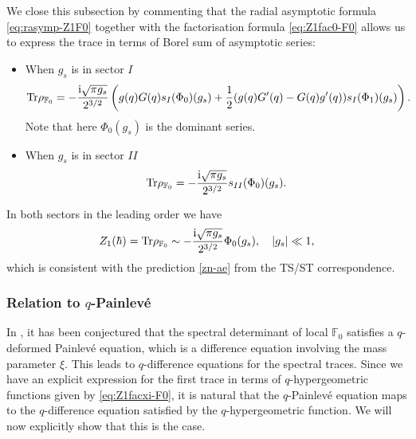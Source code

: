 \documentclass[a4paper,11pt]{article}
\theoremstyle{definition}
\def\IF{{\mathbb F}}
\newcommand{\tr}{{\rm Tr}}
\newcommand{\ri}{{\rm i}}
\begin{document}
 We close this subsection by commenting that the radial
asymptotic formula \eqref{eq:rasymp-Z1F0} together with the
factorisation formula \eqref{eq:Z1fac0-F0} allows us to express the
trace in terms of Borel sum of asymptotic series:
\begin{itemize}
\item When $g_s$ is in sector $I$
  \begin{equation}
    \tr\rho_{\IF_0} = -\frac{\ri\sqrt{\pi g_s}}{2^{3/2}}
    \left(g(q)G(q)s_I(\Phi_{0})(g_s)
      +\frac{1}{2}(g(q)G'(q)-G(q)g'(q))s_I(\Phi_{1})(g_s)\right).
  \end{equation}
  Note that here $\Phi_0(g_s)$ is the dominant series.
\item When $g_s$ is in sector $II$
  \begin{equation}
    \tr\rho_{\IF_0} = -\frac{\ri\sqrt{\pi g_s}}{2^{3/2}} s_{II}(\Phi_{0})(g_s).
  \end{equation}
\end{itemize}
In both sectors in the leading order we have
\begin{equation}
  Z_1(\hbar) = \tr\rho_{\IF_0}\sim
  -\frac{\ri\sqrt{\pi g_s}}{2^{3/2}} \Phi_0(g_s),\quad |g_s|\ll 1,
\end{equation}
which is consistent with the prediction \eqref{zn-ae} from the TS/ST
correspondence.

\subsubsection{Relation to $q$-Painlev\'e}

In \cite{bgt-qdef}, it has been conjectured that the spectral
determinant of local $\IF_0$ satisfies a $q$-deformed Painlev\'e
equation, which is a difference equation involving the mass parameter
$\xi$. This leads to $q$-difference equations for the spectral
traces. Since we have an explicit expression for the first trace in
terms of $q$-hypergeometric functions given by \eqref{eq:Z1facxi-F0},
it is natural that the $q$-Painlev\'e equation maps to the
$q$-difference equation satisfied by the $q$-hypergeometric
function. We will now explicitly show that this is the case.
\end{document}
